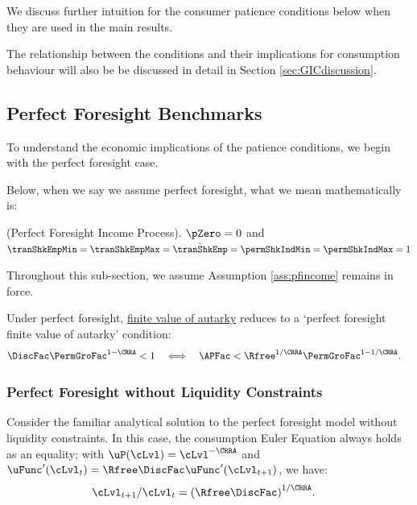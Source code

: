 \documentclass[\econtexRoot/BufferStockTheory]{subfiles}
\begin{document}
We discuss further intuition for the consumer patience conditions below when they are used in the main results.

The relationship between the conditions and their implications for consumption behaviour will also be be discussed in detail in Section \ref{sec:GICdiscussion}.

\hypertarget{Perfect-Foresight-Benchmarks}{}
\subsection{Perfect Foresight Benchmarks}\label{subsec:PFBbenchmark}
To understand the economic implications of the patience conditions, we begin with the perfect foresight case.

Below, when we say we assume perfect foresight, what we mean mathematically is:
%
\begin{assumI}\label{ass:pfincome}(Perfect Foresight Income Process).
$\pZero=0$ and $\tranShkEmpMin=\tranShkEmpMax=\bar{\tranShkEmp}=\permShkIndMin=\permShkIndMax=1$
\end{assumI}

Throughout this sub-section, we assume Assumption \ref{ass:pfincome} remains in force.

%
Under perfect foresight,  \hyperlink{FVAC}{finite value of autarky} reduces to a `perfect foresight finite value of autarky' condition: 
%
\hypertarget{PFFVAC}{}
\begin{equation}\begin{gathered}\begin{aligned}
         \DiscFac \PermGroFac^{1-\CRRA}  & <  1
         \quad\Longleftrightarrow\quad
         \APFac  <  \Rfree^{1/\CRRA}\PermGroFac^{1-1/\CRRA}.
\end{aligned}\end{gathered}\label{eq:PFFVAC}\end{equation}


\subsubsection{Perfect Foresight without Liquidity Constraints}\label{subsubsec:PFUncon}\label{subsec:PFUncon}%


Consider the familiar analytical solution to the perfect foresight model without liquidity constraints.
In this case, the consumption Euler Equation always holds as an equality; with $\uP(\cLvl)=\cLvl^{-\CRRA}$ and $\uFunc^{\prime}(\cLvl_{t})=\Rfree\DiscFac\uFunc^{\prime}(\cLvl_{t+1})$, we have:
%
%
\begin{equation}\begin{gathered}\begin{aligned}
  \cLvl_{t+1}/\cLvl_{t}  & = {(\Rfree\DiscFac)}^{1/\CRRA}. \label{eq:cGroFac}
\end{aligned}\end{gathered}\end{equation} 
%
\end{document}

